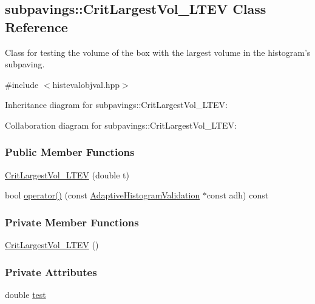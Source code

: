 \hypertarget{classsubpavings_1_1CritLargestVol__LTEV}{\subsection{subpavings\-:\-:\-Crit\-Largest\-Vol\-\_\-\-L\-T\-E\-V \-Class \-Reference}
\label{classsubpavings_1_1CritLargestVol__LTEV}
}


\-Class for testing the volume of the box with the largest volume in the histogram's subpaving.  




{\ttfamily \#include $<$histevalobjval.\-hpp$>$}



\-Inheritance diagram for subpavings\-:\-:\-Crit\-Largest\-Vol\-\_\-\-L\-T\-E\-V\-:


\-Collaboration diagram for subpavings\-:\-:\-Crit\-Largest\-Vol\-\_\-\-L\-T\-E\-V\-:
\subsubsection*{\-Public \-Member \-Functions}
\begin{DoxyCompactItemize}
\item 
\hyperlink{classsubpavings_1_1CritLargestVol__LTEV_aa3f0985b901e415aee337e1bd232e395}{\-Crit\-Largest\-Vol\-\_\-\-L\-T\-E\-V} (double t)
\item 
bool \hyperlink{classsubpavings_1_1CritLargestVol__LTEV_af596395bc98265787a542d4a4c3862e0}{operator()} (const \hyperlink{classsubpavings_1_1AdaptiveHistogramValidation}{\-Adaptive\-Histogram\-Validation} $\ast$const adh) const 
\end{DoxyCompactItemize}
\subsubsection*{\-Private \-Member \-Functions}
\begin{DoxyCompactItemize}
\item 
\hyperlink{classsubpavings_1_1CritLargestVol__LTEV_a8a9647f0583062c965fbe6aefe13eaa2}{\-Crit\-Largest\-Vol\-\_\-\-L\-T\-E\-V} ()
\end{DoxyCompactItemize}
\subsubsection*{\-Private \-Attributes}
\begin{DoxyCompactItemize}
\item 
double \hyperlink{classsubpavings_1_1CritLargestVol__LTEV_af79b24be539ff92de434c87babebd81d}{test}
\end{DoxyCompactItemize}


